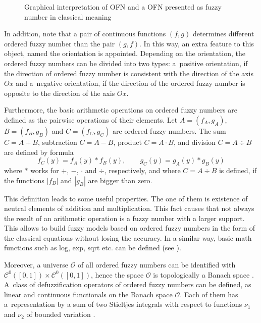 \documentclass[review]{elsarticle}
\theoremstyle{definition}
\theoremstyle{theorem}
\begin{document}
\begin{figure}[!ht]
\centering
\vspace{-25pt}
\caption{Graphical interpretation of OFN and a OFN presented as fuzzy number in classical meaning}
\label{fig:1}
\end{figure}

In addition, note that a pair of continuous functions $(f,g)$ determines different ordered fuzzy number than the pair $(g,f)$. In this way, an extra feature to this object, named the orientation is appointed. Depending on the orientation, the ordered fuzzy numbers can be divided into two types: a~positive orientation, if the direction of ordered fuzzy number is consistent with the direction of the axis $Ox$ and a~negative orientation, if the direction of the ordered fuzzy number is opposite to the direction of the axis $Ox$.

Furthermore, the basic arithmetic operations on ordered fuzzy numbers are defined as the pairwise operations of their elements. Let $A=(f_A,g_A)$, \linebreak $B=(f_B,g_B)$ and $C=(f_C,g_C)$ are ordered fuzzy numbers. The sum \linebreak $C=A+B$, subtraction $C=A-B$, product $C= A\cdot B$, and division $C=A\div B$ are defined by formula
\begin{equation}
f_C(y)=f_A(y)\ast f_B(y),\qquad g_C(y)=g_A(y)\ast g_B(y)
\end{equation}
where $\ast$ works for $+$, $-$, $\cdot$ and $\div$, respectively, and where $C=A\div B$ is defined, if the functions $|f_B|$ and $|g_B|$ are bigger than zero. 

This definition leads to some useful properties. The one of them is existence of neutral elements of addition and multiplication. This fact causes that not always the result of an arithmetic operation is a fuzzy number with a larger support. This allows to build fuzzy models based on ordered fuzzy numbers in the form of the classical equations without losing the accuracy. In a similar way, basic math functions such as log, exp, sqrt etc. can be defined (see \cite{prokopowicz}).

Moreover, a universe $\mathcal{O}$ of all ordered fuzzy numbers can be identified with $\mathcal{C}^0([0,1])\times\mathcal{C}^0([0,1])$, hence the space $\mathcal{O}$ is topologically a Banach space \cite{kos2004}. A~class of defuzzification operators of ordered fuzzy numbers can be defined, as linear and continuous functionals on the Banach space $\mathcal{O}$. Each of them has a~representation by a sum of two Stieltjes integrals with respect to functions $\nu_1$ and $\nu_2$ of bounded variation \cite{kos2010,kos2013}.
\end{document}
